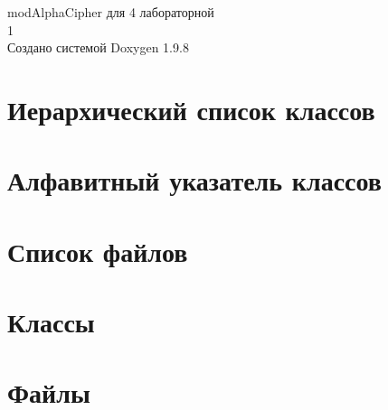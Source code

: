 \documentclass[twoside]{book}
\newcommand{\+}{\discretionary{\mbox{\scriptsize$\hookleftarrow$}}{}{}}
\newcommand{\clearemptydoublepage}{%
    \newpage{\pagestyle{empty}\cleardoublepage}%
  }
\begin{document}
  \raggedbottom
    \hypersetup{pageanchor=false,
                bookmarksnumbered=true,
                pdfencoding=unicode
               }
  \begin{titlepage}
  \vspace*{7cm}
  \begin{center}%
  {\Large mod\+Alpha\+Cipher для 4 лабораторной}\\
  [1ex]\large 1 \\
  \vspace*{1cm}
  {\large Создано системой Doxygen 1.9.8}\\
  \end{center}
  \end{titlepage}
  \clearemptydoublepage
  \tableofcontents
  \clearemptydoublepage
  \hypersetup{pageanchor=true}
\chapter{Иерархический список классов}

\chapter{Алфавитный указатель классов}

\chapter{Список файлов}

\chapter{Классы}


\chapter{Файлы}




  \backmatter
  \newpage
  \clearemptydoublepage
  \printindex
\end{document}
